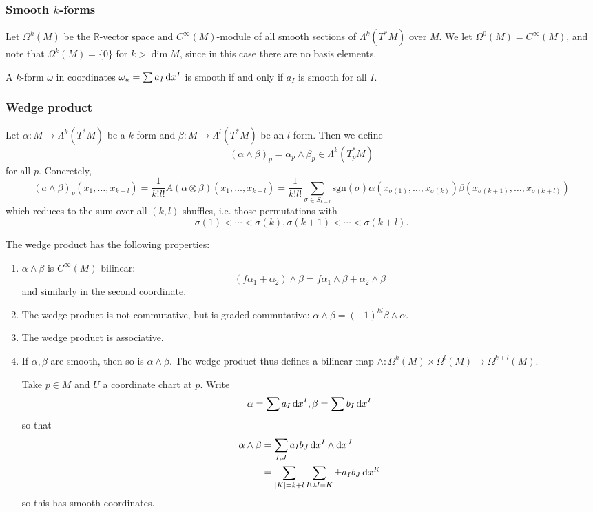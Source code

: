 \subsubsection{Smooth $k$-forms}
Let $\Omega^k(M)$ be the $\mathbb{R}$-vector space
and $C^\infty(M)$-module of all smooth sections of
$\Lambda^k(T^\ast M)$ over $M$.
We let $\Omega^0(M) = C^\infty(M)$, and note that
$\Omega^k(M) = \{ 0 \}$ for $k > \dim M$, since in this case there are
no basis elements.

A $k$-form $\omega$ in coordinates $\omega_u = \sum a_I \mathop{}\!\mathrm{d} x^I$ is
smooth if and only if $a_I$ is smooth for all $I$.

\subsubsection{Wedge product}
Let $\alpha: M \to \Lambda^k(T^\ast M)$ be a $k$-form and
$\beta : M \to \Lambda^l(T^\ast M)$ be an $l$-form. Then we define
$$
  (\alpha \wedge \beta)_p
= \alpha_p \wedge \beta_p
\in \Lambda^k(T_p^\ast M)
$$
for all $p$. Concretely,
$$
  (a \wedge \beta)_p(x_1, \dots, x_{k+l})
= \frac{1}{k!l!}
  A(\alpha \otimes \beta)(x_1, \dots, x_{k+l})
= \frac{1}{k!l!}
  \sum_{\sigma \in S_{k+l}}
    \mathrm{sgn}(\sigma)
    \alpha(x_{\sigma(1)}, \dots, x_{\sigma(k)})
    \beta(x_{\sigma(k+1)}, \dots, x_{\sigma(k+l)})
$$
which reduces to the sum over all $(k,l)$-shuffles,
i.e. those permutations with
$$
\sigma(1) < \cdots < \sigma(k),
\sigma(k+1) < \cdots < \sigma(k + l).
$$

The wedge product has the following properties:
\begin{enumerate}
  \item{
    $\alpha \wedge \beta$ is $C^\infty(M)$-bilinear:
    $$
      (f\alpha_1 + \alpha_2) \wedge \beta
    = f \alpha_1 \wedge \beta + \alpha_2 \wedge \beta
    $$
    and similarly in the second coordinate.
  }
  \item{
    The wedge product is not commutative, but is graded commutative:
    $\alpha \wedge \beta = (-1)^{kl} \beta \wedge \alpha$.
  }
  \item{
    The wedge product is associative.
  }
  \item{
    If $\alpha, \beta$ are smooth, then so is
    $\alpha \wedge \beta$. The wedge product thus defines a bilinear
    map
    $\wedge: \Omega^k(M) \times \Omega^l(M) \to \Omega^{k+l}(M)$.

    Take $p \in M$ and $U$ a coordinate chart at $p$. Write
    $$
      \alpha
    = \sum a_I \mathop{}\!\mathrm{d} x^I,
      \beta
    = \sum b_I \mathop{}\!\mathrm{d} x^I
    $$
    so that
    \begin{align*}
       \alpha \wedge \beta
    &= \sum_{I, J}
         a_I b_J \mathop{}\!\mathrm{d} x^I \wedge \mathop{}\!\mathrm{d} x^J \\
    &= \sum_{|K| = k + l}
         \sum_{I \cup J = K}
           \pm a_I b_J \mathop{}\!\mathrm{d} x^K
    \end{align*}
    so this has smooth coordinates.
  }
\end{enumerate}

